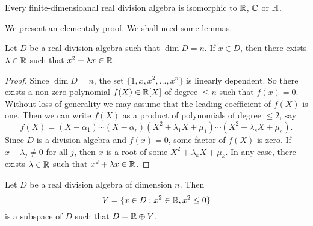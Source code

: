 \chapter{}



\begin{theorem}[Frobenius]
	\label{thm:Frobenius}
	Every finite-dimensioanal real division algebra is isomorphic to $\mathbb{R}$, $\mathbb{C}$
	or $\mathbb{H}$.
\end{theorem}

We present an elementaly proof. We shall need some lemmas. 

\begin{lemma}
	\label{lem:trick_frobenius1}
	Let $D$ be a real division algebra such that $\dim D=n$. If $x\in D$, then
	there exists $\lambda\in\mathbb{R}$ such that $x^2+\lambda x\in\mathbb{R}$.
\end{lemma}

\begin{proof}
	Since $\dim D=n$, the set $\{1,x,x^2,\dots,x^n\}$ is linearly dependent. So
	there exists a non-zero polynomial $f(X)\in\mathbb{R}[X]$ of degree $\leq n$ such
	that $f(x)=0$. Without loss of generality we may assume that the leading
	coefficient of $f(X)$ is one. Then we can write $f(X)$ as a product of
	polynomials of degree $\leq2$, say 
	\[
		f(X)=(X-\alpha_1)\cdots (X-\alpha_r)(X^2+\lambda_1 X+\mu_1)\cdots (X^2+\lambda_s X+\mu_s).
	\]
	Since $D$ is a division algebra and $f(x)=0$, some factor of $f(X)$ is
	zero. If $x-\lambda_j\ne 0$ for all $j$, then $x$ is a root of some
	$X^2+\lambda_k X+\mu_k$. In any case, there exists $\lambda\in\mathbb{R}$ such that
	$x^2+\lambda x\in\mathbb{R}$. 
\end{proof}

\begin{lemma}
	\label{lem:trick_frobenius2}
	Let $D$ be a real division algebra of dimension $n$. Then
	\[
		V=\{x\in D:x^2\in\mathbb{R},x^2\leq 0\}
	\]
	is a subspace of $D$ such that $D=\mathbb{R}\oplus V$.
\end{lemma}

